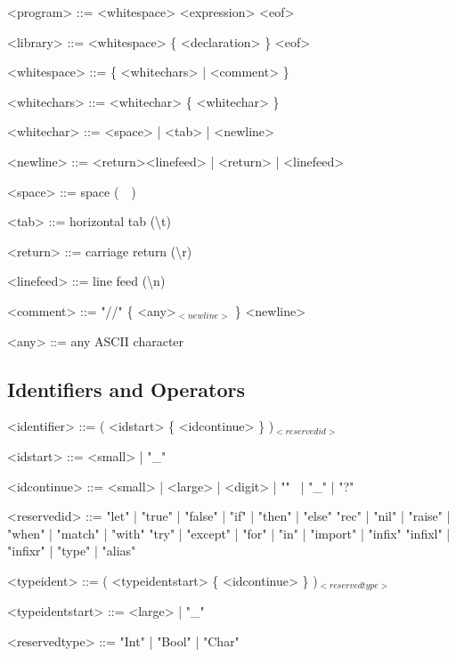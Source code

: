 \documentclass{article}
\begin{document}
\begin{grammar}
  <program> ::= <whitespace> <expression> <eof>

  <library> ::= <whitespace> \{ <declaration> \} <eof>
\end{grammar}

\begin{grammar}
  <whitespace> ::= \{ <whitechars> | <comment> \}

  <whitechars> ::= <whitechar> \{ <whitechar> \}

  <whitechar> ::= <space> | <tab> | <newline>

  <newline> ::= <return><linefeed> | <return> | <linefeed>

  <space> ::= space (\textquotesingle \ \ \textquotesingle)

  <tab> ::= horizontal tab (\textquotesingle \textbackslash t\textquotesingle)

  <return> ::= carriage return (\textquotesingle \textbackslash r\textquotesingle)

  <linefeed> ::= line feed (\textquotesingle \textbackslash n\textquotesingle)
\end{grammar}

\begin{grammar}
  <comment> ::= "//" \{ <any>$_{<newline>}$ \} <newline>

  <any> ::= any ASCII character
\end{grammar}

\subsection{Identifiers and Operators}

\begin{grammar}
  <identifier> ::= ( <idstart> \{ <idcontinue> \} )$_{<reservedid>}$

  <idstart> ::= <small> | "_"

  <idcontinue> ::= <small> | <large> | <digit> | "\textquotesingle" \ | "_" | "?"
\end{grammar}

\begin{grammar}
  <reservedid> ::= "let" | "true" | "false" | "if" | "then" | "else"
  \alt "rec" | "nil" | "raise" | "when" | "match" | "with"
  \alt "try" | "except" | "for" | "in" | "import" | "infix"
  \alt "infixl" | "infixr" | "type" | "alias"
\end{grammar}

\begin{grammar}
  <typeident> ::= ( <typeidentstart> \{ <idcontinue> \} )$_{<reservedtype>}$

  <typeidentstart> ::= <large> | "_"

  <reservedtype> ::= "Int" | "Bool" | "Char"
\end{grammar}
\end{document}
